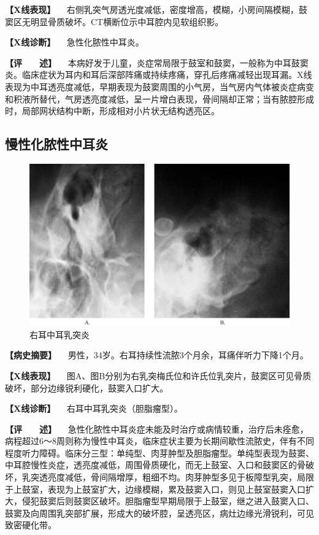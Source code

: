 \textbf{【X线表现】}
　右侧乳突气房透光度减低，密度增高，模糊，小房间隔模糊，鼓窦区无明显骨质破坏。CT横断位示中耳腔内见软组织影。

\textbf{【X线诊断】} 　急性化脓性中耳炎。

\textbf{【评　　述】}
　本病好发于儿童，炎症常局限于鼓室和鼓窦，一般称为中耳鼓窦炎。临床症状为耳内和耳后深部阵痛或持续疼痛，穿孔后疼痛减轻出现耳漏。X线表现为中耳透亮度减低，早期表现为鼓窦周围的小气房，当气房内气体被炎症病变和积液所替代，气房透亮度减低，呈一片增白表现，骨间隔却正常；当有脓腔形成时，局部网状结构中断，形成相对小片状无结构透亮区。

\subsection{慢性化脓性中耳炎}

\begin{figure}[!htbp]
 \centering
 \includegraphics{./images/Image00425.jpg}
 \captionsetup{justification=centering}
 \caption{右耳中耳乳突炎}
 \label{fig7-3-2}
  \end{figure} 

\textbf{【病史摘要】}
　男性，34岁。右耳持续性流脓3个月余，耳痛伴听力下降1个月。

\textbf{【X线表现】}
　图A、图B分别为右乳突梅氏位和许氏位乳突片，鼓窦区可见骨质破坏，部分边缘锐利硬化，鼓窦入口扩大。

\textbf{【X线诊断】} 　右耳中耳乳突炎（胆脂瘤型）。

\textbf{【评　　述】}
　急性化脓性中耳炎症未能及时治疗或病情较重，治疗后未痊愈，病程超过6～8周则称为慢性中耳炎，临床症状主要为长期间歇性流脓史，伴有不同程度听力障碍。临床分三型：单纯型、肉芽肿型及胆脂瘤型。单纯型表现为鼓窦、中耳腔慢性炎症，透亮度减低，周围骨质硬化，而无上鼓室、入口和鼓窦区的骨破坏，乳突透亮度减低，骨间隔增厚，粗细不均。肉芽肿型多见于板障型乳突，局限于上鼓室，表现为上鼓室扩大，边缘模糊，累及鼓窦入口，则见上鼓室鼓窦入口扩大，侵犯鼓窦后则鼓窦区破坏。胆脂瘤型早期局限于上鼓室，继之进入鼓窦入口、鼓窦及向周围乳突部扩展，形成大的破坏腔，呈透亮区，病灶边缘光滑锐利，可见致密硬化带。

